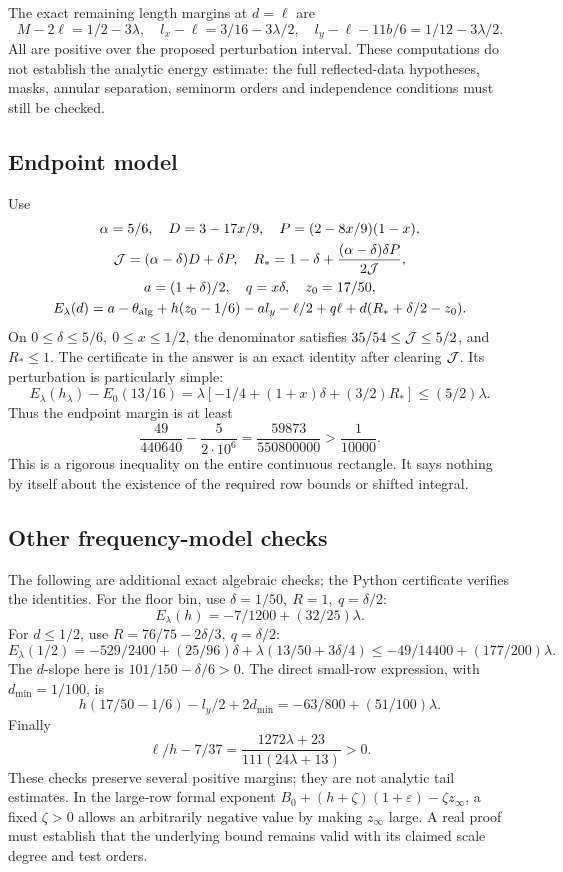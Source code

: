 \documentclass[12pt]{article}
\begin{document}
The exact remaining length margins at \(d=\ell\) are
\[
 M-2\ell=1/2-3\lambda,\quad
 l_x-\ell=3/16-3\lambda/2,\quad
 l_y-\ell-11b/6=1/12-3\lambda/2.
\]
All are positive over the proposed perturbation interval.
These computations do not establish the analytic energy estimate:
the full reflected-data hypotheses, masks, annular separation,
seminorm orders and independence conditions must still be checked.

\subsection{Endpoint model}
Use
\[
\begin{gathered}
 \alpha=5/6,\quad D=3-17x/9,\quad
 P=(2-8x/9)(1-x),\\
 {\cal J}=(\alpha-\delta)D+\delta P,\quad
 R_\ast=1-\delta+\frac{(\alpha-\delta)\delta P}{2{\cal J}},\\
 a=(1+\delta)/2,\quad q=x\delta,\quad z_0=17/50,\\
 E_\lambda(d)=a-\theta_{\rm alg}
   +h(z_0-1/6)-a l_y-\ell/2+q\ell
   +d(R_\ast+\delta/2-z_0).
\end{gathered}
\]
On \(0\leq\delta\leq5/6,\ 0\leq x\leq1/2\), the denominator satisfies
\(35/54\leq{\cal J}\leq5/2\), and \(R_\ast\leq1\).
The certificate in the answer is an exact identity after clearing
\({\cal J}\).  Its perturbation is particularly simple:
\[
 E_\lambda(h_\lambda)-E_0(13/16)
  =\lambda[-1/4+(1+x)\delta+(3/2)R_\ast]\leq(5/2)\lambda.
\]
Thus the endpoint margin is at least
\[
 \frac{49}{440640}-\frac{5}{2\cdot10^6}
 =\frac{59873}{550800000}>\frac1{10000}.
\]
This is a rigorous inequality on the entire continuous rectangle.
It says nothing by itself about the existence of the required row
bounds or shifted integral.

\subsection{Other frequency-model checks}
The following are additional exact algebraic checks; the Python
certificate verifies the identities.
For the floor bin, use \(\delta=1/50,\ R=1,\ q=\delta/2\):
\[
 E_\lambda(h)=-7/1200+(32/25)\lambda.
\]
For \(d\leq1/2\), use \(R=76/75-2\delta/3,\ q=\delta/2\):
\[
 E_\lambda(1/2)=
 -529/2400+(25/96)\delta
 +\lambda(13/50+3\delta/4)
 \leq-49/14400+(177/200)\lambda.
\]
The \(d\)-slope here is \(101/150-\delta/6>0\).
The direct small-row expression, with \(d_{\min}=1/100\), is
\[
 h(17/50-1/6)-l_y/2+2d_{\min}
       =-63/800+(51/100)\lambda.
\]
Finally
\[
 \ell/h-7/37=
       \frac{1272\lambda+23}{111(24\lambda+13)}>0.
\]
These checks preserve several positive margins; they are not
analytic tail estimates.  In the large-row formal exponent
\(B_0+(h+\zeta)(1+\varepsilon)-\zeta z_\infty\),
a fixed \(\zeta>0\) allows an arbitrarily negative value by making
\(z_\infty\) large.  A real proof must establish that the underlying
bound remains valid with its claimed scale degree and test orders.
\end{document}
